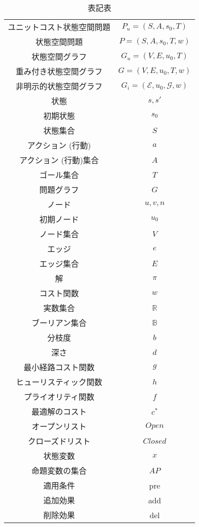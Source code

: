 \begin{table}
	\centering
	\begin{tabular}{c | c}
	ユニットコスト状態空間問題 & $P_{u} = (S, A, s_0, T)$ \\
	状態空間問題 & $P = (S, A, s_0, T, w)$ \\
	状態空間グラフ & $G_{u} = (V, E, u_0, T)$ \\
	重み付き状態空間グラフ & $G = (V, E, u_0, T, w)$ \\
	非明示的状態空間グラフ & $G_{i} = (\mathcal{E}, u_0, \mathcal{G}, w)$ \\
	状態 & $s, s'$ \\ 
	初期状態 & $s_0$ \\ 
	状態集合 & $S$ \\
	アクション (行動) & $a$ \\
	アクション (行動)集合 & $A$ \\
	ゴール集合 & $T$ \\
	問題グラフ & $G$ \\
	ノード & $u, v, n$ \\
	初期ノード & $u_0$ \\
	ノード集合 & $V$ \\
	エッジ & $e$ \\
	エッジ集合 & $E$ \\
	解 & $\pi$ \\
	コスト関数 & $w$ \\
	実数集合 & $\mathbb{R}$ \\
	ブーリアン集合 & $\mathbb{B}$ \\
	分枝度 & $b$ \\
	深さ & $d$ \\
	最小経路コスト関数 & $g$ \\
	ヒューリスティック関数 & $h$ \\
	プライオリティ関数 & $f$ \\
	最適解のコスト & $c^*$ \\
	オープンリスト & $Open$ \\
	クローズドリスト & $Closed$ \\
	状態変数 & $x$ \\
	命題変数の集合 & $AP$ \\
	適用条件 & pre \\
	追加効果 & add \\
	削除効果 & del \\
	\end{tabular}
	\caption{表記表}
	\label{notation}
\end{table}
